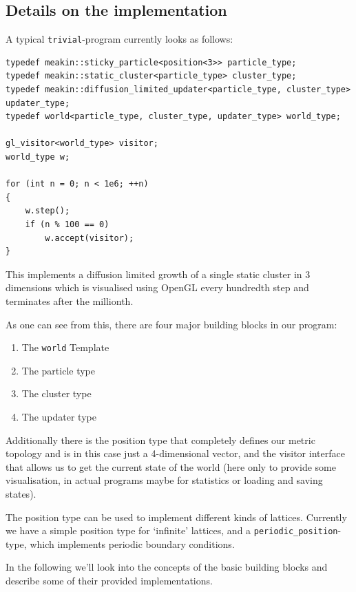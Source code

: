 \documentclass[twocolumn, 10pt]{scrartcl}
\begin{document}
        \subsection{Details on the implementation}
            A typical \lstinline'trivial'-program currently looks as follows:
            \begin{lstlisting}
typedef meakin::sticky_particle<position<3>> particle_type;
typedef meakin::static_cluster<particle_type> cluster_type;
typedef meakin::diffusion_limited_updater<particle_type, cluster_type> updater_type;
typedef world<particle_type, cluster_type, updater_type> world_type;

gl_visitor<world_type> visitor;
world_type w;

for (int n = 0; n < 1e6; ++n)
{
    w.step();
    if (n % 100 == 0)
        w.accept(visitor);
}
            \end{lstlisting}
            This implements a diffusion limited growth of a single static cluster in 3 dimensions which is visualised
            using OpenGL every hundredth step and terminates after the millionth.

            As one can see from this, there are four major building blocks in our program:
            \begin{enumerate}
                \item The \lstinline'world' Template
                \item The particle type
                \item The cluster type
                \item The updater type
            \end{enumerate}
            Additionally there is the position type that completely defines our metric topology and is in this case just
            a 4-dimensional vector, and the visitor interface that allows us to get the current state of the world (here
            only to provide some visualisation, in actual programs maybe for statistics or loading and saving states).

            The position type can be used to implement different kinds of lattices. Currently we have a simple position
            type for `infinite' lattices, and a \lstinline'periodic_position'-type, which implements periodic boundary
            conditions.

            In the following we'll look into the concepts of the basic building blocks and describe some of their
            provided implementations.
\end{document}
